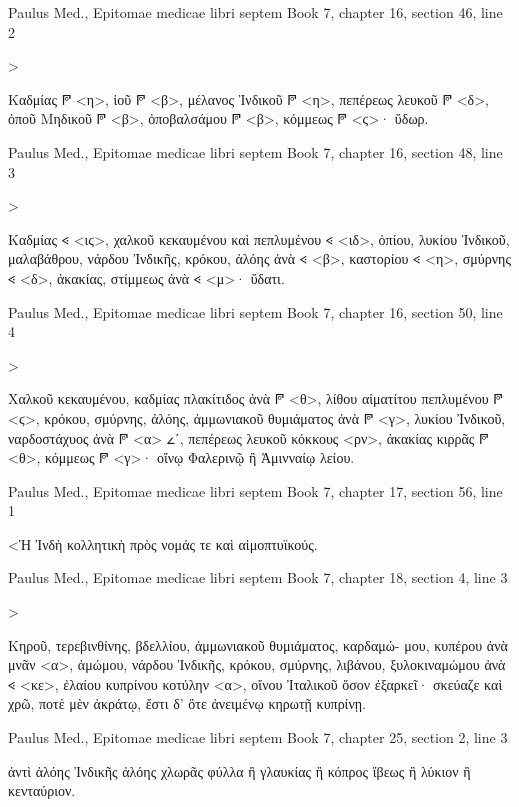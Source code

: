 \documentclass[12pt,letterpaper,twoside,final]{memoir}
\begin{document}
\begin{greek}
Paulus Med., Epitomae medicae libri septem 
Book 7, chapter 16, section 46, line 2

                             >


 Καδμίας 𐆄 <η>, ἰοῦ 𐆄 <β>, μέλανος Ἰνδικοῦ 𐆄 <η>, πεπέρεως λευκοῦ 𐆄 <δ>, 
ὀποῦ Μηδικοῦ 𐆄 <β>, ὀποβαλσάμου 𐆄 <β>, κόμμεως 𐆄 <ϛ>· ὕδωρ. 



Paulus Med., Epitomae medicae libri septem 
Book 7, chapter 16, section 48, line 3

                                            >


 Καδμίας 𐅻 <ιϛ>, χαλκοῦ κεκαυμένου καὶ πεπλυμένου 𐅻 <ιδ>, ὀπίου, 
λυκίου Ἰνδικοῦ, μαλαβάθρου, νάρδου Ἰνδικῆς, κρόκου, ἀλόης ἀνὰ 𐅻 <β>, 
καστορίου 𐅻 <η>, σμύρνης 𐅻 <δ>, ἀκακίας, στίμμεως ἀνὰ 𐅻 <μ>· ὕδατι. 



Paulus Med., Epitomae medicae libri septem 
Book 7, chapter 16, section 50, line 4

                              >


 Χαλκοῦ κεκαυμένου, καδμίας πλακίτιδος ἀνὰ 𐆄 <θ>, λίθου αἱματίτου 
πεπλυμένου 𐆄 <ϛ>, κρόκου, σμύρνης, ἀλόης, ἀμμωνιακοῦ θυμιάματος ἀνὰ 
𐆄 <γ>, λυκίου Ἰνδικοῦ, ναρδοστάχυος ἀνὰ 𐆄 <α> 𐅵ʹ, πεπέρεως λευκοῦ κόκκους 
<ρν>, ἀκακίας κιρρᾶς 𐆄 <θ>, κόμμεως 𐆄 <γ>· οἴνῳ Φαλερινῷ ἢ Ἀμινναίῳ λείου. 



Paulus Med., Epitomae medicae libri septem 
Book 7, chapter 17, section 56, line 1

<Ἡ Ἰνδὴ κολλητικὴ πρὸς νομάς τε καὶ αἱμοπτυϊκούς. 




Paulus Med., Epitomae medicae libri septem 
Book 7, chapter 18, section 4, line 3

                                                           >


 Κηροῦ, τερεβινθίνης, βδελλίου, ἀμμωνιακοῦ θυμιάματος, καρδαμώ-
μου, κυπέρου ἀνὰ μνᾶν <α>, ἀμώμου, νάρδου Ἰνδικῆς, κρόκου, σμύρνης, 
λιβάνου, ξυλοκιναμώμου ἀνὰ 𐅻 <κε>, ἐλαίου κυπρίνου κοτύλην <α>, οἴνου 
Ἰταλικοῦ ὅσον ἐξαρκεῖ· σκεύαζε καὶ χρῶ, ποτὲ μὲν ἀκράτῳ, ἔστι δ' 
ὅτε ἀνειμένῳ κηρωτῇ κυπρίνῃ. 



Paulus Med., Epitomae medicae libri septem 
Book 7, chapter 25, section 2, line 3

ἀντὶ ἀλόης Ἰνδικῆς ἀλόης χλωρᾶς φύλλα ἢ γλαυκίας ἢ κόπρος 
  ἴβεως ἢ λύκιον ἢ κενταύριον. 




\end{greek}
\end{document}

